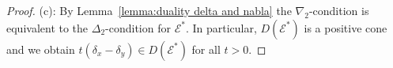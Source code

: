 \documentclass[10pt,a4paper]{amsart}
\newcommand{\R}{{\mathbb R}}
\newcommand{\cE}{{\mathcal E}}
\begin{document}
\begin{proof}
(c): By  Lemma~\ref{lemma:duality delta and nabla} the $\nabla_2$-condition is equivalent to the $\Delta_2$-condition for $\cE^*$. In particular, $D(\cE^*)$ is a positive cone and we obtain $t (\delta_x - \delta_y) \in D(\cE^*)$ for all $t > 0$. 
%  
%  
%  
%  
%  
%  
%  
\end{proof}
\end{document}
